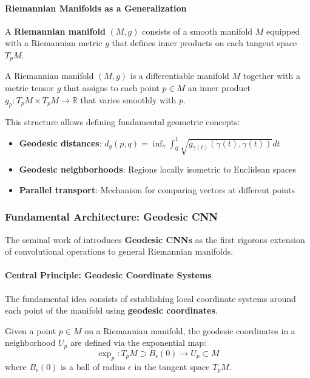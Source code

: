 \paragraph{Riemannian Manifolds as a Generalization}

A \textbf{Riemannian manifold} $(M, g)$ consists of a smooth manifold $M$ equipped with a Riemannian metric $g$ that defines inner products on each tangent space $T_p M$.

\begin{definition}
A Riemannian manifold $(M, g)$ is a differentiable manifold $M$ together with a metric tensor $g$ that assigns to each point $p \in M$ an inner product $g_p: T_p M \times T_p M \to \mathbb{R}$ that varies smoothly with $p$.
\end{definition}

This structure allows defining fundamental geometric concepts:
\begin{itemize}
    \item \textbf{Geodesic distances}: $d_g(p,q) = \inf_{\gamma} \int_0^1 \sqrt{g_{\gamma(t)}(\dot{\gamma}(t), \dot{\gamma}(t))} dt$
    \item \textbf{Geodesic neighborhoods}: Regions locally isometric to Euclidean spaces
    \item \textbf{Parallel transport}: Mechanism for comparing vectors at different points
\end{itemize}

\subsubsection{Fundamental Architecture: Geodesic CNN}

The seminal work of \citet{masci2018geodesicconvolutionalneural} introduces \textbf{Geodesic CNNs} as the first rigorous extension of convolutional operations to general Riemannian manifolds.

\paragraph{Central Principle: Geodesic Coordinate Systems}

The fundamental idea consists of establishing local coordinate systems around each point of the manifold using \textbf{geodesic coordinates}.

\begin{definition}
Given a point $p \in M$ on a Riemannian manifold, the geodesic coordinates in a neighborhood $U_p$ are defined via the exponential map:
\begin{equation}
\exp_p: T_p M \supset B_\epsilon(0) \to U_p \subset M
\end{equation}
where $B_\epsilon(0)$ is a ball of radius $\epsilon$ in the tangent space $T_p M$.
\end{definition}

